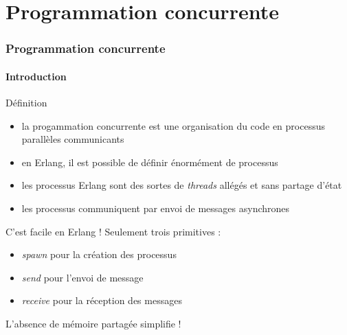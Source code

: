 \section{Programmation concurrente}

\begin{frame}
  \frametitle{Programmation concurrente}
  \framesubtitle{Introduction}

  \begin{block}{Définition}
    \begin{itemize}
    \item la progammation concurrente est une organisation du code en
      processus parallèles communicants
    \item en Erlang, il est possible de définir énormément de processus
    \item les processus Erlang sont des sortes de \textit{threads} allégés et
      sans partage d'état
    \item les processus communiquent par envoi de messages asynchrones
    \end{itemize}
  \end{block}

  \begin{alertblock}{C'est facile en Erlang !}
    Seulement trois primitives :
    \begin{itemize}
    \item \textit{spawn} pour la création des processus
    \item \textit{send} pour l'envoi de message
    \item \textit{receive} pour la réception des messages
    \end{itemize}
    L'absence de mémoire partagée simplifie !
  \end{alertblock}

\end{frame}

